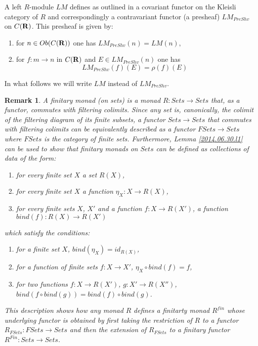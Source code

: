 \documentclass[11pt]{article}
\newenvironment{eq}{\begin{equation}}{\end{equation}}
\newtheorem{remark}[proposition]{Remark}
\newcommand{\llabel}[1]{\label{#1}[{\bf #1}]}
\newcommand{\comment}[1]{}
\newcommand{\sr}{\rightarrow}
\newcommand{\rr}{{\bf R}}
\newcommand{\wh}{\widehat}
\newcommand{\bind}{bind}
\newcommand{\mbind}{\rho}
\newcommand{\spc}{{\,\,\,\,\,\,\,}}
\begin{document}
{A left $R$-module $LM$ defines as outlined in \cite[Def. 10]{HM2010} a covariant functor on the Kleisli category of $R$ and correspondingly a contravariant functor (a presheaf) $LM_{PreShv}$ on ${C(\rr)}$. This presheaf is given by:
%
\begin{enumerate}
\item for $n\in Ob({C(\rr)})$ one has $LM_{PreShv}(n)=LM(n)$,
\item for $f:m\sr n$ in ${C(\rr)}$ and $E\in LM_{PreShv}(n)$ one has
%
$$LM_{PreShv}(f)(E)=\mbind(f)(E)$$
%
\end{enumerate}
%
In what follows we will write $LM$ instead of $LM_{PreShv}$.  

\comment{
For two morphisms 
%
$$f:\wh{n_1}\sr \wh{n_2}\spc f=(f_1,\dots,f_{n_2})\spc where\spc f_i\in R(\wh{n_1})$$
$$g:\wh{n_2}\sr \wh{n_3}\spc g=(g_1,\dots,g_{n_3})\spc where\spc g_i\in R(\wh{n_2})$$
%
their composition is given by
%
\begin{eq}\llabel{2015.07.26.eq1}
f\circ g:\wh{n_1}\sr \wh{n_3}\spc f\circ g=((f\circ g)_1,\dots,(f\circ g)_{n_3}) \spc where\spc (f\circ g)_i\in R(\wh{n_3})
\end{eq}
%
and 
%
\begin{eq}\llabel{2015.07.26.eq2}
(f\circ g)_i=(f_1,\dots,f_{n_2})\circ g_i=g_i(f_1/1,\dots,f_{n_2}/n_2)
\end{eq}
%
}
%
\begin{remark}\rm
A finitary monad (on sets) is a monad $R:Sets\sr Sets$ that, as a functor, commutes with filtering colimits. Since any set is, canonically, the colimit of the filtering diagram of its finite subsets, a functor $Sets \sr Sets$ that commutes with filtering colimits can be equivalently described as a functor $FSets \sr Sets$ where $FSets$ is the category of finite sets. Furthermore, Lemma \ref{2014.06.30.l1} can be used to show that finitary monads on $Sets$ can be defined as collections of data of the form:
%
\begin{enumerate}
\item for every finite set $X$ a set $R(X)$,
\item for every finite set $X$ a function $\eta_X: X \sr R(X)$,
\item for every finite sets $X$, $X'$ and a function $f:X\sr R(X')$, a function $ \bind(f):R(X)\sr R(X')$
\end{enumerate}
%
which satisfy the conditions:
%
\begin{enumerate}
\item for a finite set $X$, $\bind(\eta_X)=id_{R(X)}$,
\item for a function of finite sets $f:X\sr X'$, $\eta_X\circ \bind(f)=f$,
\item for two functions $f:X\sr R(X')$, $g:X'\sr R(X'')$, $ \bind(f\circ \bind(g))= \bind(f)\circ \bind(g)$.
\end{enumerate}
%
This description shows how any monad $R$ defines a finitarty monad $R^{fin}$ whose underlying functor is obtained by first taking the restriction of $R$ to a functor $R_{FSets}:FSets\sr Sets$ and then the extension of $R_{FSets}$ to a finitary functor $R^{Fin}:Sets\sr Sets$. 


\end{remark}}
\end{document}
